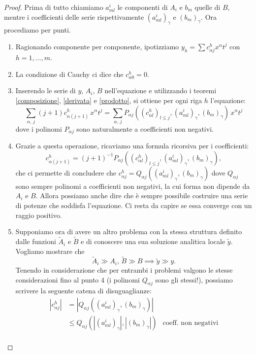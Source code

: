 \begin{proof}
Prima di tutto chiamiamo $a^i_{ml}$ le componenti di $A_i$  e $b_m$ quelle di $B$, mentre i coefficienti delle serie rispettivamente $(a^i_{ml})_\gamma$ e $(b_m)_\gamma$. Ora procediamo per punti.
\begin{enumerate}
\item Ragionando componente per componente, ipotizziamo $y_h = \sum c^h_{\alpha j} x^\alpha t^j$ con ${h=1,\ldots, m}$.
\item La condizione di Cauchy ci dice che $c^h_{\alpha 0}=0$.
\item Inserendo le serie di $y,\, A_i,\, B$ nell'equazione e utilizzando i teoremi \ref{composizione}, \ref{derivata} e \ref{prodotto}, si ottiene per ogni riga $h$ l'equazione:
$$\sum\limits_{\alpha, \, j} (j+1)c^h_{\alpha (j+1)}\, x^\alpha t^j = \sum\limits_{\alpha,\, j} P_{\alpha j}\left((c^h_{\alpha l})_{l\leq j},(a^i_{ml})_\gamma, (b_m)_\gamma\right) \, x^\alpha t^j$$
dove i polinomi $P_{\alpha j}$ sono naturalmente a coefficienti non negativi.
\item Grazie a questa operazione, ricaviamo una formula ricorsiva per i coefficienti:
$$ c^h_{\alpha (j+1)}= (j+1)^{-1} P_{\alpha j}\left((c^h_{\alpha l})_{l\leq j},(a^i_{ml})_\gamma, (b_m)_\gamma\right),$$
che ci permette di concludere che $c^h_{\alpha j} = Q_{\alpha j}\left((a^i_{ml})_\gamma, (b_m)_\gamma\right)$ dove $Q_{\alpha j}$ sono sempre polinomi a coefficienti non negativi, la cui forma non dipende da $A_i$ e $B$. Allora possiamo anche dire che è sempre possibile costruire una serie di potenze che soddisfa l'equazione. Ci resta da capire se essa converge con un raggio positivo.
\newpage
\item Supponiamo ora di avere un altro problema con la stessa struttura definito dalle funzioni $\widetilde{A}_i $ e $\widetilde{B}$ e di conoscere una sua soluzione analitica locale $\widetilde{y}$. Vogliamo mostrare che $$\widetilde{A}_i \gg A_i, \, \widetilde{B} \gg B \implies \widetilde{y} \gg y.$$
Tenendo in considerazione che per entrambi i problemi valgono le stesse considerazioni fino al punto 4 (i polinomi $Q_{\alpha j}$ sono gli stessi!), possiamo scrivere la seguente catena di disuguaglianze:
\begin{align*}
\left|c^h_{\alpha j}\right| &= \left|Q_{\alpha j}\left((a^i_{ml})_\gamma, (b_m)_\gamma\right)\right|\\
&\leq Q_{\alpha j}\left(\left|(a^i_{ml})_\gamma\right|, \left|(b_m)_\gamma\right|\right) 
& \text{coeff. non negativi}\\

\end{align*}
\end{enumerate}
\end{proof}

